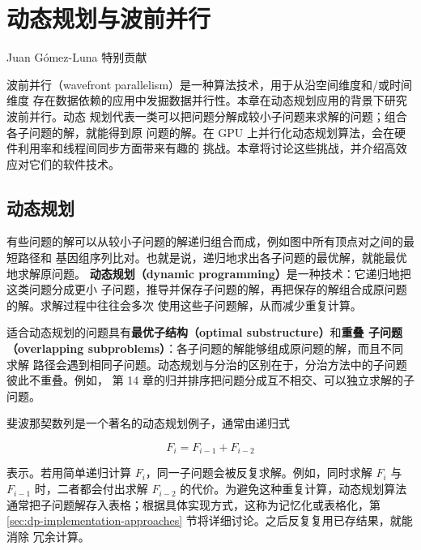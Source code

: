 \chapter{动态规划与波前并行}
\label{chap:dynamic-programming-wavefront}
\chaptercontents

\setcounter{footnote}{0}

\begin{flushright}
  \small Juan G\'omez-Luna 特别贡献
\end{flushright}

波前并行（wavefront parallelism）是一种算法技术，用于从沿空间维度和/或时间维度
存在数据依赖的应用中发掘数据并行性。本章在动态规划应用的背景下研究波前并行。动态
规划代表一类可以把问题分解成较小子问题来求解的问题；组合各子问题的解，就能得到原
问题的解。在 GPU 上并行化动态规划算法，会在硬件利用率和线程间同步方面带来有趣的
挑战。本章将讨论这些挑战，并介绍高效应对它们的软件技术。

\section{动态规划}
\label{sec:dynamic-programming}

有些问题的解可以从较小子问题的解递归组合而成，例如图中所有顶点对之间的最短路径和
基因组序列比对。也就是说，递归地求出各子问题的最优解，就能最优地求解原问题。
\textbf{动态规划（dynamic programming）}是一种技术：它递归地把这类问题分成更小
子问题，推导并保存子问题的解，再把保存的解组合成原问题的解。求解过程中往往会多次
使用这些子问题解，从而减少重复计算。

适合动态规划的问题具有\textbf{最优子结构（optimal substructure）}和\textbf{重叠
子问题（overlapping subproblems）}：各子问题的解能够组成原问题的解，而且不同求解
路径会遇到相同子问题。动态规划与分治的区别在于，分治方法中的子问题彼此不重叠。例如，
第 14 章的归并排序把问题分成互不相交、可以独立求解的子问题。

斐波那契数列是一个著名的动态规划例子，通常由递归式

\begin{equation}
  F_i=F_{i-1}+F_{i-2}
  \label{eq:16-1}
\end{equation}

表示。若用简单递归计算 $F_i$，同一子问题会被反复求解。例如，同时求解 $F_i$ 与
$F_{i-1}$ 时，二者都会付出求解 $F_{i-2}$ 的代价。为避免这种重复计算，动态规划算法
通常把子问题解存入表格；根据具体实现方式，这称为记忆化或表格化，第
\ref{sec:dp-implementation-approaches} 节将详细讨论。之后反复复用已存结果，就能消除
冗余计算。

